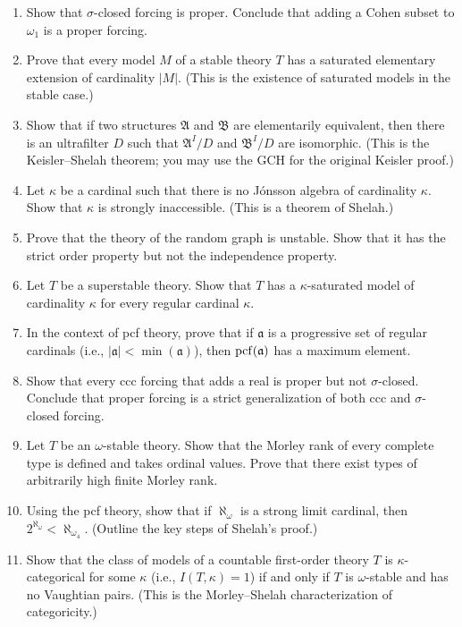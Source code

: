 \begin{enumerate}
    \item [I] Show that \(\sigma\)-closed forcing is proper. Conclude that adding a Cohen subset to \(\omega_1\) is a proper forcing.
    \item [I] Prove that every model \(M\) of a stable theory \(T\) has a saturated elementary extension of cardinality \(|M|\). (This is the existence of saturated models in the stable case.)
    \item [A] Show that if two structures \(\mathfrak{A}\) and \(\mathfrak{B}\) are elementarily equivalent, then there is an ultrafilter \(D\) such that \(\mathfrak{A}^I/D\) and \(\mathfrak{B}^I/D\) are isomorphic. (This is the Keisler--Shelah theorem; you may use the GCH for the original Keisler proof.)
    \item [A] Let \(\kappa\) be a cardinal such that there is no J\'onsson algebra of cardinality \(\kappa\). Show that \(\kappa\) is strongly inaccessible. (This is a theorem of Shelah.)
    \item [I] Prove that the theory of the random graph is unstable. Show that it has the strict order property but not the independence property.
    \item [I] Let \(T\) be a superstable theory. Show that \(T\) has a \(\kappa\)-saturated model of cardinality \(\kappa\) for every regular cardinal \(\kappa\).
    \item [A] In the context of pcf theory, prove that if \(\mathfrak{a}\) is a progressive set of regular cardinals (i.e., \(|\mathfrak{a}| < \min(\mathfrak{a})\)), then \(\operatorname{pcf}(\mathfrak{a})\) has a maximum element.
    \item [I] Show that every ccc forcing that adds a real is proper but not \(\sigma\)-closed. Conclude that proper forcing is a strict generalization of both ccc and \(\sigma\)-closed forcing.
    \item [I] Let \(T\) be an \(\omega\)-stable theory. Show that the Morley rank of every complete type is defined and takes ordinal values. Prove that there exist types of arbitrarily high finite Morley rank.
    \item [A] Using the pcf theory, show that if \(\aleph_\omega\) is a strong limit cardinal, then \(2^{\aleph_\omega} < \aleph_{\omega_4}\). (Outline the key steps of Shelah's proof.)
    \item [A] Show that the class of models of a countable first-order theory \(T\) is \(\kappa\)-categorical for some \(\kappa\) (i.e., \(I(T,\kappa) = 1\)) if and only if \(T\) is \(\omega\)-stable and has no Vaughtian pairs. (This is the Morley--Shelah characterization of categoricity.)
\end{enumerate}

